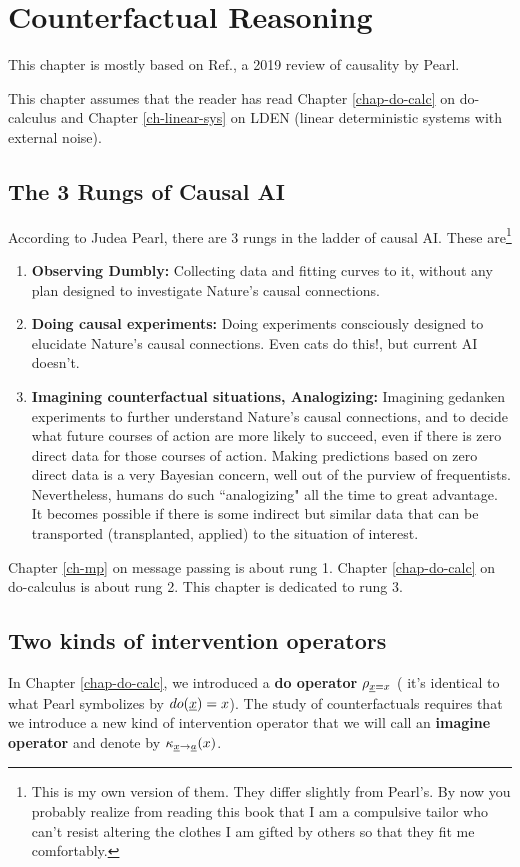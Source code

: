 \chapter{Counterfactual Reasoning}
\label{ch-counterf}
This chapter is mostly based on 
Ref.\cite{pearl-2019review}, a 2019
 review of causality by Pearl.

This chapter
assumes that the reader
has read
Chapter \ref{chap-do-calc}
on do-calculus and
Chapter \ref{ch-linear-sys}  
on LDEN (linear 
deterministic systems
with external noise).

\section*{The 3 Rungs of Causal AI}
According to 
Judea Pearl,
there are 3 rungs in the
ladder of causal AI.
These are\footnote{This is my
own version of them. They differ 
slightly from Pearl's.  By now
you probably realize 
from reading
this book that I am a compulsive tailor
who can't resist  
altering the clothes I am gifted 
by others so that they fit
me comfortably.}
\begin{enumerate}
\item
{\bf Observing Dumbly:} Collecting 
data
and fitting curves to it,
without any plan 
designed to
investigate Nature's 
causal connections.
\item {\bf Doing causal
experiments:} 
Doing experiments 
consciously designed to
elucidate
Nature's causal connections.
Even cats do this!, but current AI doesn't.
\item {\bf Imagining
 counterfactual situations, Analogizing:}
Imagining gedanken experiments
to further understand
Nature's causal connections,
and to decide what future
courses of action are
more likely to succeed,
even if there is zero
direct data for 
those courses of action.
Making
predictions based
on zero direct data is a very Bayesian
concern, well out of the purview of 
frequentists. Nevertheless,
humans do such
``analogizing" 
all the time to great advantage.
It becomes
possible if there
is some indirect but similar
data that can be transported
(transplanted, applied)
to the situation of
interest.
\end{enumerate}
Chapter \ref{ch-mp}
on message passing
is about rung 1.
Chapter \ref{chap-do-calc}
on do-calculus is about rung 2.
This chapter is dedicated to rung 3.



\section*{Two kinds of
 intervention operators}
In Chapter \ref{chap-do-calc},
we introduced a {\bf do operator}
$\rho_{{\underline{x}}=x}$ (
it's identical to what Pearl 
symbolizes by $do({\underline{x}})=x$).
The study of counterfactuals 
requires that we
introduce a new
kind of intervention
operator that we will
call an {\bf imagine operator}
and denote by $\kappa_{{\underline{x}}\rightarrow{\underline{a}}}(x)$.

